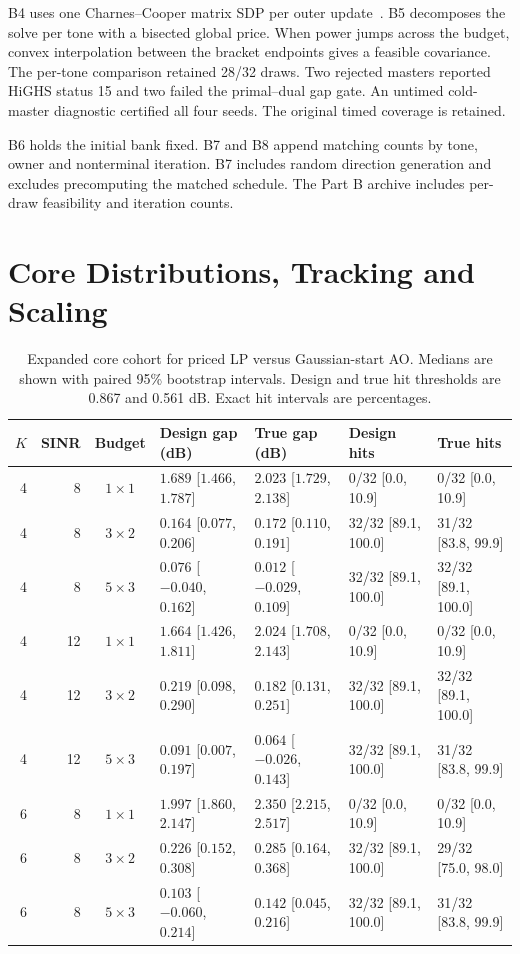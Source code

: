 \documentclass[journal]{IEEEtran}
\begin{document}
B4 uses one Charnes--Cooper matrix SDP per outer update~\cite{charnes}. B5 decomposes the solve per tone with a bisected global price. When power jumps across the budget, convex interpolation between the bracket endpoints gives a feasible covariance. The per-tone comparison retained 28/32 draws. Two rejected masters reported HiGHS status 15 and two failed the primal--dual gap gate. An untimed cold-master diagnostic certified all four seeds. The original timed coverage is retained.

B6 holds the initial bank fixed. B7 and B8 append matching counts by tone, owner and nonterminal iteration. B7 includes random direction generation and excludes precomputing the matched schedule. The Part B archive includes per-draw feasibility and iteration counts.

\section{Core Distributions, Tracking and Scaling}
\begin{table}[t]
\caption{Expanded core cohort for priced LP versus Gaussian-start AO. Medians are shown with paired 95\% bootstrap intervals. Design and true hit thresholds are 0.867 and 0.561 dB. Exact hit intervals are percentages.}
\label{tab:core}
\centering\footnotesize
\setlength{\tabcolsep}{3pt}
\begin{tabular}{@{}rrcllll@{}}
\toprule
\(K\) & SINR & Budget & Design gap (dB) & True gap (dB) & Design hits & True hits\\
\midrule
4 & 8 & $1\times1$ & $1.689$ [$1.466$, $1.787$] & $2.023$ [$1.729$, $2.138$] & 0/32 [0.0, 10.9] & 0/32 [0.0, 10.9] \\
4 & 8 & $3\times2$ & $0.164$ [$0.077$, $0.206$] & $0.172$ [$0.110$, $0.191$] & 32/32 [89.1, 100.0] & 31/32 [83.8, 99.9] \\
4 & 8 & $5\times3$ & $0.076$ [$-0.040$, $0.162$] & $0.012$ [$-0.029$, $0.109$] & 32/32 [89.1, 100.0] & 32/32 [89.1, 100.0] \\
4 & 12 & $1\times1$ & $1.664$ [$1.426$, $1.811$] & $2.024$ [$1.708$, $2.143$] & 0/32 [0.0, 10.9] & 0/32 [0.0, 10.9] \\
4 & 12 & $3\times2$ & $0.219$ [$0.098$, $0.290$] & $0.182$ [$0.131$, $0.251$] & 32/32 [89.1, 100.0] & 32/32 [89.1, 100.0] \\
4 & 12 & $5\times3$ & $0.091$ [$0.007$, $0.197$] & $0.064$ [$-0.026$, $0.143$] & 32/32 [89.1, 100.0] & 31/32 [83.8, 99.9] \\
6 & 8 & $1\times1$ & $1.997$ [$1.860$, $2.147$] & $2.350$ [$2.215$, $2.517$] & 0/32 [0.0, 10.9] & 0/32 [0.0, 10.9] \\
6 & 8 & $3\times2$ & $0.226$ [$0.152$, $0.308$] & $0.285$ [$0.164$, $0.368$] & 32/32 [89.1, 100.0] & 29/32 [75.0, 98.0] \\
6 & 8 & $5\times3$ & $0.103$ [$-0.060$, $0.214$] & $0.142$ [$0.045$, $0.216$] & 32/32 [89.1, 100.0] & 31/32 [83.8, 99.9] \\
\bottomrule
\end{tabular}
\end{table}
\end{document}

